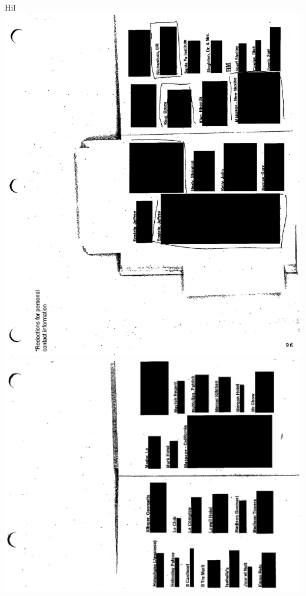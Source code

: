 \documentclass[10pt]{article}
\begin{document}
Hil\\
\includegraphics[max width=\textwidth, center]{2025_02_27_dd68c3d38de88f0516d9g-213}\\
\includegraphics[max width=\textwidth, center]{2025_02_27_dd68c3d38de88f0516d9g-214}\\
\end{document}

